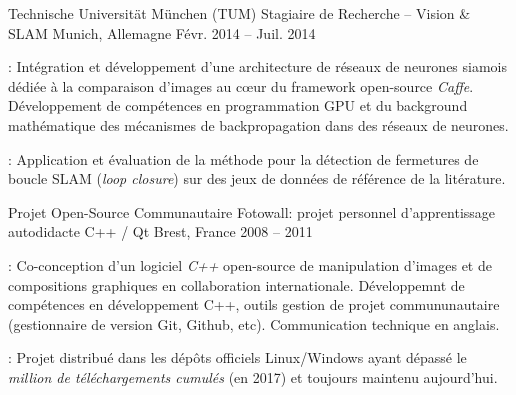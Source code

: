 \begin{cventries}
\cventry
    {Technische Universität München (TUM)} %
    {Stagiaire de Recherche -- Vision \& SLAM} %
    {Munich, Allemagne} %
    {Févr. 2014 -- Juil. 2014} %
    {
      \begin{cvitems} %
        \item {} : Intégration et développement d'une architecture de réseaux de neurones siamois dédiée à la comparaison d'images au cœur du framework open-source \emph{Caffe}. Développement de compétences en programmation GPU et du background mathématique des mécanismes de backpropagation dans des réseaux de neurones.
        \item {} : Application et évaluation de la méthode pour la détection de fermetures de boucle SLAM (\emph{loop closure}) sur des jeux de données de référence de la litérature.
      \end{cvitems}
    }

\cventry
    {Projet Open-Source Communautaire} %
    {Fotowall: projet personnel d'apprentissage autodidacte C++ / Qt} %
    {Brest, France} %
    {2008 -- 2011} %
    {
      \begin{cvitems} %
        \item {} : Co-conception d'un logiciel \emph{C++} open-source de manipulation d'images et de compositions graphiques en collaboration internationale. Développemnt de compétences en développement C++, outils gestion de projet commununautaire (gestionnaire de version Git, Github, etc). Communication technique en anglais.
        \item {} : Projet distribué dans les dépôts officiels Linux/Windows ayant dépassé le \emph{million de téléchargements cumulés} (en 2017) et toujours maintenu aujourd'hui.
      \end{cvitems}
    }
\end{cventries}




